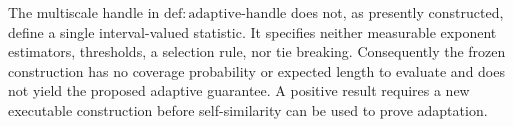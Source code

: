 The multiscale handle in \(\mathrm{def:adaptive\text{-}handle}\) does not, as presently constructed, define a single interval-valued statistic. It specifies neither measurable exponent estimators, thresholds, a selection rule, nor tie breaking. Consequently the frozen construction has no coverage probability or expected length to evaluate and does not yield the proposed adaptive guarantee. A positive result requires a new executable construction before self-similarity can be used to prove adaptation.